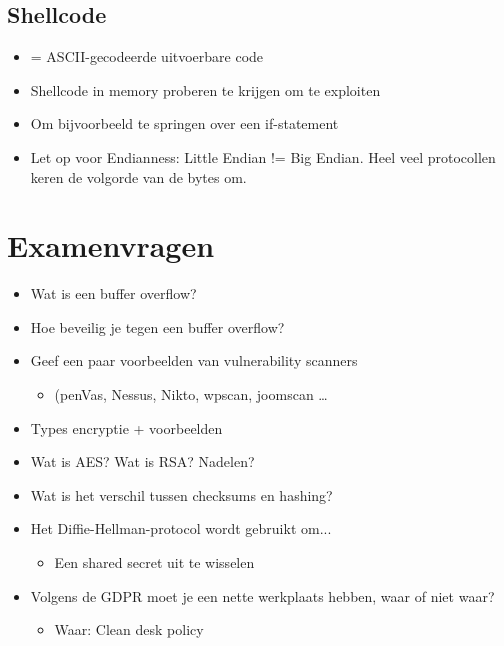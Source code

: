 \documentclass{article}
\begin{document}
\subsection{Shellcode}

\begin{itemize}
    \item = ASCII-gecodeerde uitvoerbare code
    \item Shellcode in memory proberen te krijgen om te exploiten
    \item Om bijvoorbeeld te springen over een if-statement
    \item Let op voor Endianness: Little Endian != Big Endian. Heel veel protocollen keren de volgorde van de bytes om.
\end{itemize}


\section{Examenvragen}

\begin{itemize}
    \item Wat is een buffer overflow?
    \item Hoe beveilig je tegen een buffer overflow?
    \item Geef een paar voorbeelden van vulnerability scanners 
    \begin{itemize}
        \item (penVas, Nessus, Nikto, wpscan, joomscan \dots
    \end{itemize}
    \item Types encryptie + voorbeelden
    \item Wat is AES? Wat is RSA? Nadelen?
    \item Wat is het verschil tussen checksums en hashing?
    \item Het Diffie-Hellman-protocol wordt gebruikt om...
    \begin{itemize}
        \item Een shared secret uit te wisselen 
    \end{itemize}
    \item Volgens de GDPR moet je een nette werkplaats hebben, waar of niet waar?
    \begin{itemize}
        \item Waar: Clean desk policy
    \end{itemize}
\end{itemize}
\end{document}
